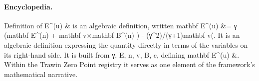 \paragraph{Encyclopedia.}
Definition of E\textasciicircum{}(u) \& is an algebraic definition, written mathbf E\textasciicircum{}(u) \&= γ (mathbf E\textasciicircum{}(n) + mathbf v×mathbf B\textasciicircum{}(n) ) - (γ\textasciicircum{}2)/(γ+1)mathbf v(. It is an algebraic definition expressing the quantity directly in terms of the variables on its right-hand side. It is built from γ, E, n, v, B, c, defining mathbf E\textasciicircum{}(u) \&. Within the Trawin Zero Point registry it serves as one element of the framework's mathematical narrative.
